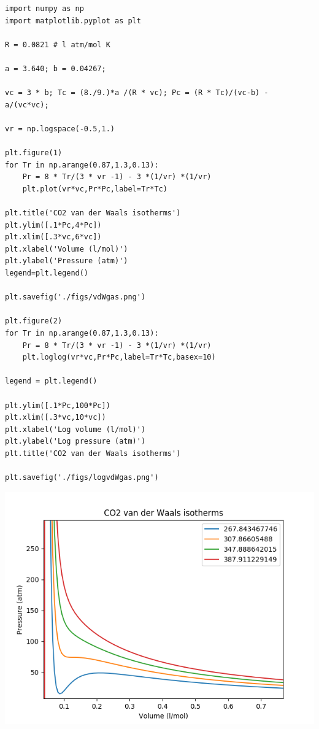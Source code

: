 \documentclass[11pt]{article}
\begin{document}
\begin{verbatim}
import numpy as np
import matplotlib.pyplot as plt

R = 0.0821 # l atm/mol K

a = 3.640; b = 0.04267;

vc = 3 * b; Tc = (8./9.)*a /(R * vc); Pc = (R * Tc)/(vc-b) - a/(vc*vc);

vr = np.logspace(-0.5,1.)

plt.figure(1)
for Tr in np.arange(0.87,1.3,0.13):
    Pr = 8 * Tr/(3 * vr -1) - 3 *(1/vr) *(1/vr)
    plt.plot(vr*vc,Pr*Pc,label=Tr*Tc)

plt.title('CO2 van der Waals isotherms')
plt.ylim([.1*Pc,4*Pc])
plt.xlim([.3*vc,6*vc])
plt.xlabel('Volume (l/mol)')
plt.ylabel('Pressure (atm)')
legend=plt.legend()

plt.savefig('./figs/vdWgas.png')

plt.figure(2)
for Tr in np.arange(0.87,1.3,0.13):
    Pr = 8 * Tr/(3 * vr -1) - 3 *(1/vr) *(1/vr)
    plt.loglog(vr*vc,Pr*Pc,label=Tr*Tc,basex=10)

legend = plt.legend()

plt.ylim([.1*Pc,100*Pc])
plt.xlim([.3*vc,10*vc])
plt.xlabel('Log volume (l/mol)')
plt.ylabel('Log pressure (atm)')
plt.title('CO2 van der Waals isotherms')

plt.savefig('./figs/logvdWgas.png')
\end{verbatim}

\includegraphics[width=.9\linewidth]{./figs/vdWgas.png}
\end{document}

